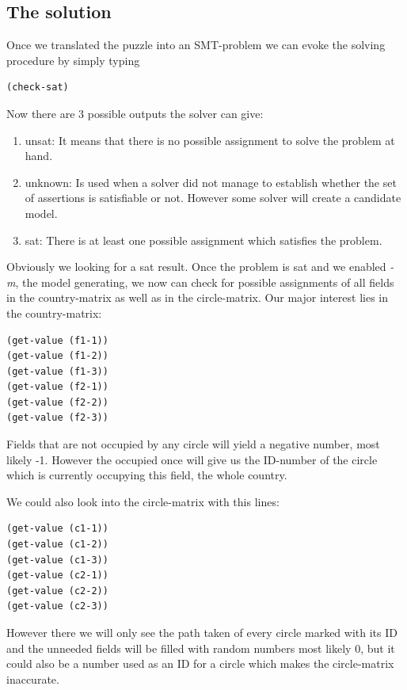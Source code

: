 \subsection{The solution}
Once we translated the puzzle into an SMT-problem we can evoke the solving procedure by simply typing
\begin{lstlisting}
(check-sat)
\end{lstlisting}
Now there are 3 possible outputs the solver can give:
\begin{enumerate}
  \item unsat: It means that there is no possible assignment to solve the problem at hand.
  \item unknown: Is used when a solver did not manage to establish whether the set of assertions is satisfiable or not. However some solver will create a candidate model.
  \item sat: There is at least one possible assignment which satisfies the problem.
\end{enumerate}
Obviously we looking for a sat result. Once the problem is sat and we enabled \emph{-m}, the model generating, we now can check for possible assignments of all fields in the country-matrix as well as in the circle-matrix. Our major interest lies in the country-matrix:
\begin{lstlisting}
(get-value (f1-1))
(get-value (f1-2))
(get-value (f1-3))
(get-value (f2-1))
(get-value (f2-2))
(get-value (f2-3))
\end{lstlisting}
Fields that are not occupied by any circle will yield a negative number, most likely -1. However the occupied once will give us the ID-number of the circle which is currently occupying this field, the whole country.

We could also look into the circle-matrix with this lines:
\begin{lstlisting}
(get-value (c1-1))
(get-value (c1-2))
(get-value (c1-3))
(get-value (c2-1))
(get-value (c2-2))
(get-value (c2-3))
\end{lstlisting}
However there we will only see the path taken of every circle marked with its ID and the unneeded fields will be filled with random numbers most likely 0, but it could also be a number used as an ID for a circle which makes the circle-matrix inaccurate.

